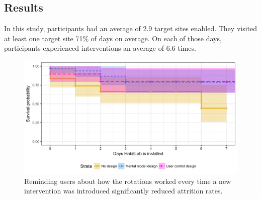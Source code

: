 \subsection{Results}

In this study, participants had an average of 2.9 target sites enabled. They visited at least one target site 71\% of days on average. On each of those days, participants experienced interventions an average of 6.6 times.


\begin{figure}[tb]
\centering
	\includegraphics[width=1.0\textwidth]{figures/none_vs_info.png}
	\caption{Reminding users about how the rotations worked every time a new intervention was introduced significantly reduced attrition rates.}
\label{fig:attrition_none_vs_info}
\end{figure}

